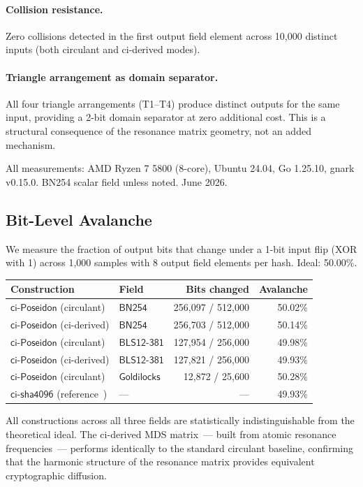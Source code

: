 \documentclass[preprint]{iacrtrans}
\newcommand{\BN}{\ensuremath{\mathsf{BN254}}}
\newcommand{\BLS}{\ensuremath{\mathsf{BLS12\text{-}381}}}
\newcommand{\GL}{\ensuremath{\mathsf{Goldilocks}}}
\newcommand{\ciposeidon}{\ensuremath{\mathsf{ci\text{-}Poseidon}}}
\newcommand{\cisha}{\ensuremath{\mathsf{ci\text{-}sha4096}}}
\begin{document}
\paragraph{Collision resistance.}
Zero collisions detected in the first output field element across
10{,}000 distinct inputs (both circulant and ci-derived modes).

\paragraph{Triangle arrangement as domain separator.}
All four triangle arrangements (T1--T4) produce distinct outputs for the
same input, providing a 2-bit domain separator at zero additional cost.
This is a structural consequence of the resonance matrix geometry, not
an added mechanism.



All measurements: AMD Ryzen 7 5800 (8-core), Ubuntu 24.04, Go 1.25.10,
gnark v0.15.0. BN254 scalar field unless noted. June 2026.

\subsection{Bit-Level Avalanche}

We measure the fraction of output bits that change under a 1-bit input flip
(XOR with 1) across 1,000 samples with 8 output field elements per hash.
Ideal: 50.00\%.

\begin{center}
\begin{tabular}{llrr}
\toprule
Construction & Field & Bits changed & Avalanche \\
\midrule
\ciposeidon{} (circulant) & $\BN$  & 256,097 / 512,000 & 50.02\% \\
\ciposeidon{} (ci-derived) & $\BN$  & 256,703 / 512,000 & 50.14\% \\
\ciposeidon{} (circulant) & $\BLS$ & 127,954 / 256,000 & 49.98\% \\
\ciposeidon{} (ci-derived) & $\BLS$ & 127,821 / 256,000 & 49.93\% \\
\ciposeidon{} (circulant) & $\GL$  & 12,872 / 25,600   & 50.28\% \\
\cisha{} (reference~\cite{See26})   & ---    & ---               & 49.93\% \\
\bottomrule
\end{tabular}
\end{center}

All constructions across all three fields are statistically indistinguishable
from the theoretical ideal. The ci-derived MDS matrix~--- built from atomic
resonance frequencies~--- performs identically to the standard circulant
baseline, confirming that the harmonic structure of the resonance matrix
provides equivalent cryptographic diffusion.
\end{document}
